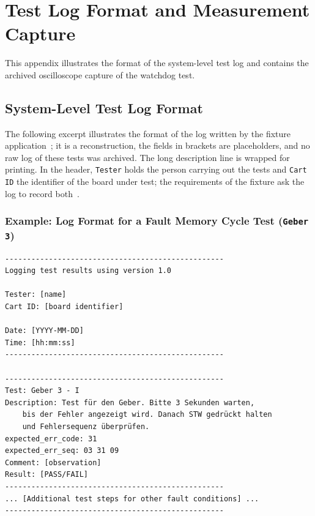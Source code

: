 \chapter{Test Log Format and Measurement Capture}
\label{app:test_logs}

This appendix illustrates the format of the system-level test log and contains the archived oscilloscope capture of the watchdog test.

\section{System-Level Test Log Format}
\label{sec:app_system_log_excerpts}

The following excerpt illustrates the format of the log written by the fixture application~\cite{dolata2023}; it is a reconstruction, the fields in brackets are placeholders, and no raw log of these tests was archived. The long description line is wrapped for printing. In the header, \texttt{Tester} holds the person carrying out the tests and \texttt{Cart ID} the identifier of the board under test; the requirements of the fixture ask the log to record both~\cite[Sec.~3.1.5]{dolata2023}.

\subsection*{Example: Log Format for a Fault Memory Cycle Test (\texttt{Geber 3})}

{\footnotesize
\begin{verbatim}
--------------------------------------------------
Logging test results using version 1.0

Tester: [name]
Cart ID: [board identifier]

Date: [YYYY-MM-DD]
Time: [hh:mm:ss]
--------------------------------------------------

--------------------------------------------------
Test: Geber 3 - I
Description: Test für den Geber. Bitte 3 Sekunden warten,
    bis der Fehler angezeigt wird. Danach STW gedrückt halten
    und Fehlersequenz überprüfen.
expected_err_code: 31
expected_err_seq: 03 31 09
Comment: [observation]
Result: [PASS/FAIL]
--------------------------------------------------
... [Additional test steps for other fault conditions] ...
--------------------------------------------------
\end{verbatim}
}

